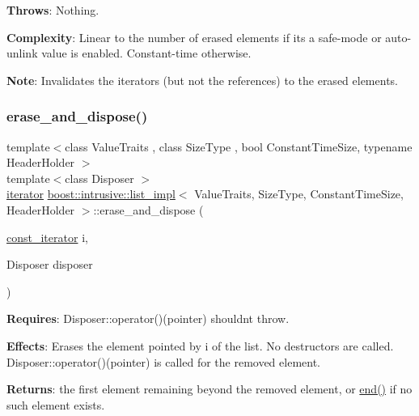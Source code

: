 {\bfseries Throws}\+: Nothing.

{\bfseries Complexity}\+: Linear to the number of erased elements if it\textquotesingle{}s a safe-\/mode or auto-\/unlink value is enabled. Constant-\/time otherwise.

{\bfseries Note}\+: Invalidates the iterators (but not the references) to the erased elements. \mbox{\label{classboost_1_1intrusive_1_1list__impl_a53330d72d48a69f95f337752b609f060}} 
\subsubsection{\texorpdfstring{erase\+\_\+and\+\_\+dispose()}{erase\_and\_dispose()}\hspace{0.1cm}{\footnotesize\ttfamily [1/3]}}
{\footnotesize\ttfamily template$<$class Value\+Traits , class Size\+Type , bool Constant\+Time\+Size, typename Header\+Holder $>$ \\
template$<$class Disposer $>$ \\
\hyperlink{classboost_1_1intrusive_1_1list__impl_a15c0189bf62eb9fb98bc07ef10b8cb23}{iterator} \hyperlink{classboost_1_1intrusive_1_1list__impl}{boost\+::intrusive\+::list\+\_\+impl}$<$ Value\+Traits, Size\+Type, Constant\+Time\+Size, Header\+Holder $>$\+::erase\+\_\+and\+\_\+dispose (\begin{DoxyParamCaption}\item[{\hyperlink{classboost_1_1intrusive_1_1list__impl_af4ced710fe02662c5650d161af83d8cd}{const\+\_\+iterator}}]{i,  }\item[{Disposer}]{disposer }\end{DoxyParamCaption})\hspace{0.3cm}{\ttfamily [inline]}}

{\bfseries Requires}\+: Disposer\+::operator()(pointer) shouldn\textquotesingle{}t throw.

{\bfseries Effects}\+: Erases the element pointed by i of the list. No destructors are called. Disposer\+::operator()(pointer) is called for the removed element.

{\bfseries Returns}\+: the first element remaining beyond the removed element, or \hyperlink{classboost_1_1intrusive_1_1list__impl_af2a454471fced6d4b2fb899c50bbee67}{end()} if no such element exists.

